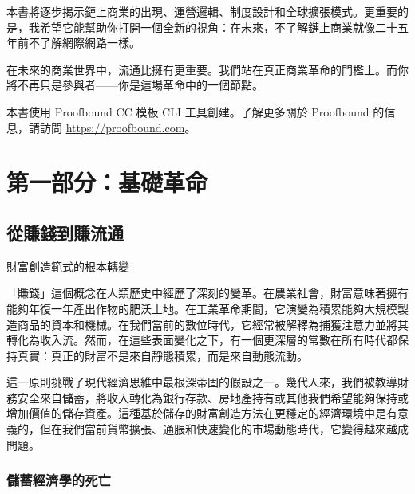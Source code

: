 \documentclass[
  Letterpaper,
]{scrbook}
\begin{document}
本書將逐步揭示鏈上商業的出現、運營邏輯、制度設計和全球擴張模式。更重要的是，我希望它能幫助你打開一個全新的視角：在未來，不了解鏈上商業就像二十五年前不了解網際網路一樣。

在未來的商業世界中，流通比擁有更重要。我們站在真正商業革命的門檻上。而你將不再只是參與者------你是這場革命中的一個節點。

\begin{tcolorbox}[enhanced jigsaw, arc=.35mm, coltitle=black, rightrule=.15mm, colframe=quarto-callout-note-color-frame, title=\textcolor{quarto-callout-note-color}{\faInfo}\hspace{0.5em}{關於本書}, bottomtitle=1mm, left=2mm, opacitybacktitle=0.6, colback=white, colbacktitle=quarto-callout-note-color!10!white, bottomrule=.15mm, toprule=.15mm, leftrule=.75mm, breakable, titlerule=0mm, toptitle=1mm, opacityback=0]

本書使用 Proofbound CC 模板 CLI 工具創建。了解更多關於 Proofbound
的信息，請訪問 \url{https://proofbound.com}。

\end{tcolorbox}

\part{第一部分：基礎革命}

\chapter{從賺錢到賺流通}\label{sec-earning-circulation}

財富創造範式的根本轉變

「賺錢」這個概念在人類歷史中經歷了深刻的變革。在農業社會，財富意味著擁有能夠年復一年產出作物的肥沃土地。在工業革命期間，它演變為積累能夠大規模製造商品的資本和機械。在我們當前的數位時代，它經常被解釋為捕獲注意力並將其轉化為收入流。然而，在這些表面變化之下，有一個更深層的常數在所有時代都保持真實：真正的財富不是來自靜態積累，而是來自動態流動。

這一原則挑戰了現代經濟思維中最根深蒂固的假設之一。幾代人來，我們被教導財務安全來自儲蓄，將收入轉化為銀行存款、房地產持有或其他我們希望能夠保持或增加價值的儲存資產。這種基於儲存的財富創造方法在更穩定的經濟環境中是有意義的，但在我們當前貨幣擴張、通脹和快速變化的市場動態時代，它變得越來越成問題。

\section{儲蓄經濟學的死亡}\label{ux5132ux84c4ux7d93ux6fdfux5b78ux7684ux6b7bux4ea1}
\end{document}
